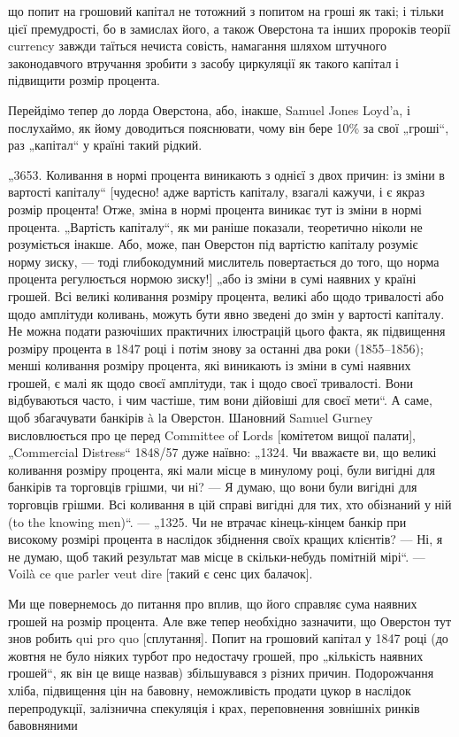 \parcont{}  %
що попит на грошовий капітал не тотожний з попитом на гроші
як такі; і тільки цієї премудрості, бо в замислах його, а також
Оверстона та інших пророків теорії currency завжди таїться нечиста совість, намагання шляхом
штучного законодавчого втручання зробити з засобу циркуляції як такого капітал і підвищити
розмір процента.

Перейдімо тепер до лорда Оверстона, або, інакше, Samuel
Jones Loyd’a, і послухаймо, як йому доводиться пояснювати, чому
він бере 10\% за свої „гроші“, раз „капітал“ у країні такий
рідкий.

„3653. Коливання в нормі процента виникають з однієї з двох
причин: із зміни в вартості капіталу“ [чудесно! адже вартість
капіталу, взагалі кажучи, і є якраз розмір процента! Отже, зміна
в нормі процента виникає тут із зміни в нормі процента. „Вартість капіталу“, як ми раніше показали,
теоретично ніколи не
розуміється інакше. Або, може, пан Оверстон під вартістю
капіталу розуміє норму зиску, — тоді глибокодумний мислитель
повертається до того, що норма процента регулюється нормою
зиску!] „або із зміни в сумі наявних у країні грошей. Всі великі
коливання розміру процента, великі або щодо тривалості або
щодо амплітуди коливань, можуть бути явно зведені до змін
у вартості капіталу. Не можна подати разючіших практичних ілюстрацій цього факта, як підвищення
розміру процента в 1847 році
і потім знову за останні два роки (1855--1856); менші коливання
розміру процента, які виникають із зміни в сумі наявних грошей,
є малі як щодо своєї амплітуди, так і щодо своєї тривалості. Вони
відбуваються часто, і чим частіше, тим вони дійовіші для своєї
мети“. А саме, щоб збагачувати банкірів à lа Оверстон. Шановний Samuel Gurney висловлюється про це
перед Committee of
Lords [комітетом вищої палати], „Commercial Distress“ 1848/57 дуже
наївно: „1324. Чи вважаєте ви, що великі коливання розміру
процента, які мали місце в минулому році, були вигідні для
банкірів та торговців грішми, чи ні? — Я думаю, що вони були
вигідні для торговців грішми. Всі коливання в цій справі вигідні
для тих, хто обізнаний у ній (to the knowing men)“. — „1325. Чи не
втрачає кінець-кінцем банкір при високому розмірі процента
в наслідок збіднення своїх кращих клієнтів? — Ні, я не думаю,
щоб такий результат мав місце в скільки-небудь помітній мірі“. — Voilà ce que parler veut dire
[такий є сенс цих балачок].

Ми ще повернемось до питання про вплив, що його справляє
сума наявних грошей на розмір процента. Але вже тепер необхідно зазначити, що Оверстон тут знов
робить qui pro quo [сплутання]. Попит на грошовий капітал у 1847 році (до жовтня не
було ніяких турбот про недостачу грошей, про „кількість
наявних грошей“, як він це вище назвав) збільшувався з різних
причин. Подорожчання хліба, підвищення цін на бавовну, неможливість продати цукор в наслідок
перепродукції, залізнична
спекуляція і крах, переповнення зовнішніх ринків бавовняними
\parbreak{}  %

